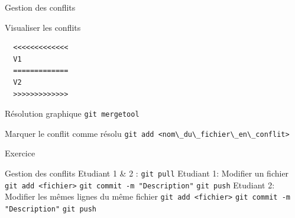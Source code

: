 \documentclass{beamer}
\begin{document}
\begin{frame}[fragile]{Gestion des conflits}
  \begin{block}{Visualiser les conflits}
\begin{verbatim}
  <<<<<<<<<<<<<
  V1
  =============
  V2
  >>>>>>>>>>>>>
\end{verbatim}
  \end{block}

  \begin{block}{Résolution graphique}
    \textcolor{commandcolor}{\verb?git mergetool?}
  \end{block}
  
  \begin{block}{Marquer le conflit comme résolu}
    \textcolor{commandcolor}{\verb?git add <nom\_du\_fichier\_en\_conflit>?}
  \end{block}
\end{frame}

\begin{frame}[fragile]{Exercice}
  \begin{exampleblock}{Gestion des conflits}
    Etudiant 1 \& 2 :\linebreak
    \textcolor{commandcolor}{\verb?git pull?}\linebreak
    \linebreak
    Etudiant 1:\linebreak
    Modifier un fichier\linebreak
    \textcolor{commandcolor}{\verb?git add <fichier>?}\linebreak
    \textcolor{commandcolor}{\verb?git commit -m "Description"?}\linebreak
    \textcolor{commandcolor}{\verb?git push?}\linebreak
    \linebreak
    Etudiant 2:\linebreak
    Modifier les mêmes lignes du même fichier\linebreak
    \textcolor{commandcolor}{\verb?git add <fichier>?}\linebreak
    \textcolor{commandcolor}{\verb?git commit -m "Description"?}\linebreak
    \textcolor{commandcolor}{\verb?git push?}
  \end{exampleblock}
\end{frame}
\end{document}
